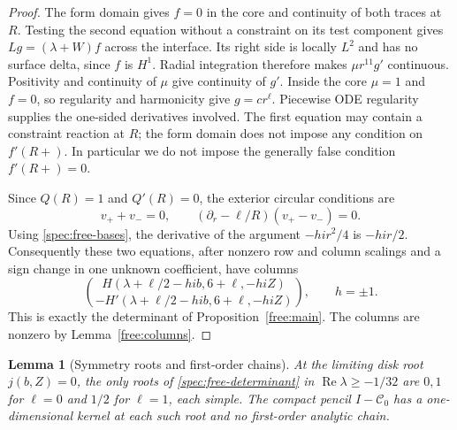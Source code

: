 \documentclass[11pt]{article}
\numberwithin{equation}{section}
\newtheorem{lemma}[theorem]{Lemma}
\theoremstyle{definition}
\theoremstyle{remark}
\begin{document}
\begin{proof}
The form domain gives $f=0$ in the core and continuity of both traces
at $R$. Testing the second equation without a constraint on its test
component gives
$Lg=(\lambda+W)f$ across the interface. Its right side is locally
$L^2$ and has no surface delta, since $f$ is $H^1$. Radial integration
therefore makes $\mu r^{11}g'$ continuous. Positivity and continuity
of $\mu$ give continuity of $g'$. Inside the core $\mu=1$ and $f=0$,
so regularity and harmonicity give $g=c r^\ell$.
Piecewise ODE regularity supplies the one-sided derivatives involved.
The first equation may contain a constraint reaction at $R$; the form
domain does not impose any condition on $f'(R+)$. In particular we
do not impose the generally false condition $f'(R+)=0$.

Since $Q(R)=1$ and $Q'(R)=0$, the exterior circular conditions are
\[
 v_++v_-=0,\qquad
 (\partial_r-\ell/R)(v_+-v_-)=0.
\]
Using \eqref{spec:free-bases}, the derivative of the argument
$-hi r^2/4$ is $-hi r/2$. Consequently these two equations, after
nonzero row and column scalings and a sign change in one unknown
coefficient, have columns
\begin{equation}\label{spec:free-determinant}
 \binom{H(\lambda+\ell/2-hib,6+\ell,-hiZ)}
       {-H'(\lambda+\ell/2-hib,6+\ell,-hiZ)},\qquad h=\pm1.
\end{equation}
This is exactly the determinant of Proposition~\ref{free:main}.
The columns are nonzero by Lemma~\ref{free:columns}.
\end{proof}

\begin{lemma}[Symmetry roots and first-order chains]\label{spec:simplicity}
At the limiting disk root $j(b,Z)=0$, the only roots of
\eqref{spec:free-determinant} in $\operatorname{Re}\lambda\ge-1/32$
are $0,1$ for $\ell=0$ and $1/2$ for $\ell=1$, each simple.
The compact pencil $I-\mathcal C_0$ has a one-dimensional kernel at
each such root and no first-order analytic chain.
\end{lemma}
\end{document}
